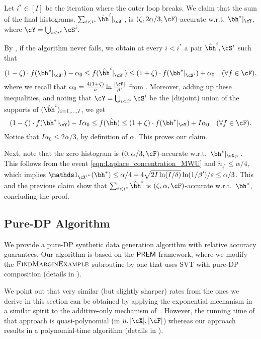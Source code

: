 \begin{proofof}{}
Let $i^*\in[I]$ be the iteration where the outer loop breaks. We claim that the sum of the final histograms, $\sum_{i< i^{\ast}}\hbh^{i}|_{\cS^i}$, is $(\zeta,2\alpha/3,\cF)$-accurate w.r.t. $\bh^{\ast}|_{\cY}$, where $\cY=\bigcup_{i<i^{\ast}}\cS^i$.


By ,
if the algorithm never fails, we obtain at every $i<i^{\ast}$ a pair $\hbh^{i},\cS^i$ such that 
\[ (1-\zeta) \cdot f(\bh^{\ast}|_{\cS^i}) - \alpha_0 \leq   f(\hbh^{i}|_{\cS^i}) \leq (1+\zeta) \cdot  f(\bh^{\ast}|_{\cS^i}) +\alpha_0 \quad(\forall f\in \cF),\]
where we recall that $\alpha_0=\frac{4(1+\zeta)}{a}\ln \frac{|\cF|}{\beta'}$ from . Moreover, 
adding up these inequalities, and noting that $\cY=\bigcup_{i<i^{\ast}} \cS^i$ be the (disjoint) union of the supports of $(\hbh^{i})_{i=1,\ldots,I}$, we get
\[ (1-\zeta) \cdot f(\bh^{\ast}|_{\cY}) - I\alpha_0 \leq f(\hbh) \leq (1+\zeta) \cdot f(\bh^{\ast}|_\cY) +I\alpha_0 \quad(\forall f\in \cF).\]
Notice that $I\alpha_0\leq 2\alpha/3$, by definition of $\alpha$. This proves our claim.

Next, 
note that the zero histogram 
is $(0,\alpha/3,\cF)$-accurate w.r.t.~$\bh^{\ast}|_{\cX_{i^{\ast}}}$. This  follows from the event \eqref{eqn:Laplace_concentration_MWU} and $\tilde n_{i^{\ast}}\leq \alpha/4$, which implies $\ind_{\cX^{i^*}}(\bh^{\ast}) \leq \alpha/4+4\sqrt{2I\ln(I/\delta)}\ln(1/\beta')/\eps\leq \alpha/3$. This and the previous claim show that $\sum_{i<i^{\ast}} \hbh^i$ is $(\zeta,\alpha,\cF)$-accurate w.r.t.~$\bh^{\ast}$, concluding the proof.
\end{proofof}



\subsection{Pure-DP Algorithm}

\label{sec:pure_DP_UB}


We provide a pure-DP synthetic data generation algorithm with relative accuracy guarantees. Our algorithm is based on the $\mathsf{PREM}$ framework, where we modify the $\textsc{FindMarginExample}$ subroutine by one that uses SVT with pure-DP composition (details in ).

We point out that very similar (but slightly sharper) rates from the ones we derive in this section can be obtained by applying the exponential mechanism in a similar spirit to the additive-only mechanism of~\cite{BlumLR13}. However, the running time of that approach is quasi-polynomial (in $n, |\cX|, |\cF|$) whereas our approach results in a polynomial-time algorithm (details in ).

